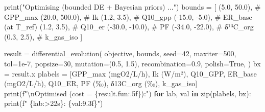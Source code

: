 \documentclass[
  letterpaper,
  DIV=11,
  numbers=noendperiod]{scrartcl}
\newenvironment{Shaded}{\begin{snugshade}}{\end{snugshade}}
\newcommand{\BuiltInTok}[1]{\textcolor[rgb]{0.00,0.23,0.31}{#1}}
\newcommand{\CharTok}[1]{\textcolor[rgb]{0.13,0.47,0.30}{#1}}
\newcommand{\CommentTok}[1]{\textcolor[rgb]{0.37,0.37,0.37}{#1}}
\newcommand{\ControlFlowTok}[1]{\textcolor[rgb]{0.00,0.23,0.31}{\textbf{#1}}}
\newcommand{\DecValTok}[1]{\textcolor[rgb]{0.68,0.00,0.00}{#1}}
\newcommand{\FloatTok}[1]{\textcolor[rgb]{0.68,0.00,0.00}{#1}}
\newcommand{\KeywordTok}[1]{\textcolor[rgb]{0.00,0.23,0.31}{\textbf{#1}}}
\newcommand{\NormalTok}[1]{\textcolor[rgb]{0.00,0.23,0.31}{#1}}
\newcommand{\OperatorTok}[1]{\textcolor[rgb]{0.37,0.37,0.37}{#1}}
\newcommand{\SpecialCharTok}[1]{\textcolor[rgb]{0.37,0.37,0.37}{#1}}
\newcommand{\SpecialStringTok}[1]{\textcolor[rgb]{0.13,0.47,0.30}{#1}}
\newcommand{\StringTok}[1]{\textcolor[rgb]{0.13,0.47,0.30}{#1}}
\newcommand{\VariableTok}[1]{\textcolor[rgb]{0.07,0.07,0.07}{#1}}
\begin{document}
\begin{Shaded}
\begin{Highlighting}[]
\BuiltInTok{print}\NormalTok{(}\StringTok{"Optimising (bounded DE + Bayesian priors) ..."}\NormalTok{)}
\NormalTok{bounds }\OperatorTok{=}\NormalTok{ [}
\NormalTok{    (}\FloatTok{5.0}\NormalTok{, }\FloatTok{50.0}\NormalTok{),     }\CommentTok{\# GPP\_max}
\NormalTok{    (}\FloatTok{20.0}\NormalTok{, }\FloatTok{500.0}\NormalTok{),   }\CommentTok{\# Ik}
\NormalTok{    (}\FloatTok{1.2}\NormalTok{, }\FloatTok{3.5}\NormalTok{),      }\CommentTok{\# Q10\_gpp}
\NormalTok{    (}\OperatorTok{{-}}\FloatTok{15.0}\NormalTok{, }\OperatorTok{{-}}\FloatTok{5.0}\NormalTok{),   }\CommentTok{\# ER\_base (at T\_ref)}
\NormalTok{    (}\FloatTok{1.2}\NormalTok{, }\FloatTok{3.5}\NormalTok{),      }\CommentTok{\# Q10\_er}
\NormalTok{    (}\OperatorTok{{-}}\FloatTok{30.0}\NormalTok{, }\OperatorTok{{-}}\FloatTok{10.0}\NormalTok{),  }\CommentTok{\# PF}
\NormalTok{    (}\OperatorTok{{-}}\FloatTok{34.0}\NormalTok{, }\OperatorTok{{-}}\FloatTok{22.0}\NormalTok{),  }\CommentTok{\# δ¹³C\_org}
\NormalTok{    (}\FloatTok{0.3}\NormalTok{, }\FloatTok{2.5}\NormalTok{),      }\CommentTok{\# k\_gas\_iso}
\NormalTok{]}

\NormalTok{result }\OperatorTok{=}\NormalTok{ differential\_evolution(}
\NormalTok{    objective, bounds, seed}\OperatorTok{=}\DecValTok{42}\NormalTok{,}
\NormalTok{    maxiter}\OperatorTok{=}\DecValTok{500}\NormalTok{, tol}\OperatorTok{=}\FloatTok{1e{-}7}\NormalTok{,}
\NormalTok{    popsize}\OperatorTok{=}\DecValTok{30}\NormalTok{, mutation}\OperatorTok{=}\NormalTok{(}\FloatTok{0.5}\NormalTok{, }\FloatTok{1.5}\NormalTok{), recombination}\OperatorTok{=}\FloatTok{0.9}\NormalTok{,}
\NormalTok{    polish}\OperatorTok{=}\VariableTok{True}\NormalTok{,}
\NormalTok{)}
\NormalTok{bx }\OperatorTok{=}\NormalTok{ result.x}
\NormalTok{plabels }\OperatorTok{=}\NormalTok{ [}\StringTok{\textquotesingle{}GPP\_max (mgO2/L/h)\textquotesingle{}}\NormalTok{, }\StringTok{\textquotesingle{}Ik (W/m²)\textquotesingle{}}\NormalTok{, }\StringTok{\textquotesingle{}Q10\_GPP\textquotesingle{}}\NormalTok{,}
           \StringTok{\textquotesingle{}ER\_base (mgO2/L/h)\textquotesingle{}}\NormalTok{, }\StringTok{\textquotesingle{}Q10\_ER\textquotesingle{}}\NormalTok{, }\StringTok{\textquotesingle{}PF (‰)\textquotesingle{}}\NormalTok{, }\StringTok{\textquotesingle{}δ13C\_org (‰)\textquotesingle{}}\NormalTok{, }\StringTok{\textquotesingle{}k\_gas\_iso\textquotesingle{}}\NormalTok{]}
\BuiltInTok{print}\NormalTok{(}\SpecialStringTok{f"}\CharTok{\textbackslash{}n}\SpecialStringTok{Optimised (cost = }\SpecialCharTok{\{}\NormalTok{result}\SpecialCharTok{.}\NormalTok{fun}\SpecialCharTok{:.5f\}}\SpecialStringTok{):"}\NormalTok{)}
\ControlFlowTok{for}\NormalTok{ lab, val }\KeywordTok{in} \BuiltInTok{zip}\NormalTok{(plabels, bx):}
    \BuiltInTok{print}\NormalTok{(}\SpecialStringTok{f"  }\SpecialCharTok{\{}\NormalTok{lab}\SpecialCharTok{:\textgreater{}22s\}}\SpecialStringTok{: }\SpecialCharTok{\{}\NormalTok{val}\SpecialCharTok{:9.3f\}}\SpecialStringTok{"}\NormalTok{)}
\end{Highlighting}
\end{Shaded}
\end{document}
